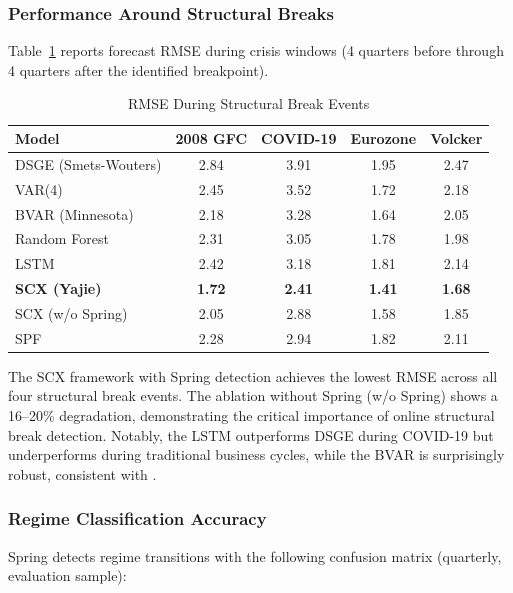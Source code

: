 \documentclass[12pt,a4paper]{article}
\begin{document}
\subsubsection{Performance Around Structural Breaks}

Table~\ref{tab:crisis} reports forecast RMSE during crisis windows
(4 quarters before through 4 quarters after the identified breakpoint).

\begin{table}[htbp]
\centering
\caption{RMSE During Structural Break Events}
\label{tab:crisis}
\begin{tabular}{lcccc}
\toprule
Model & 2008 GFC & COVID-19 & Eurozone & Volcker \\
\midrule
DSGE (Smets-Wouters)   & 2.84 & 3.91 & 1.95 & 2.47 \\
VAR(4)                 & 2.45 & 3.52 & 1.72 & 2.18 \\
BVAR (Minnesota)       & 2.18 & 3.28 & 1.64 & 2.05 \\
Random Forest          & 2.31 & 3.05 & 1.78 & 1.98 \\
LSTM                   & 2.42 & 3.18 & 1.81 & 2.14 \\
\midrule
\textbf{SCX (Yajie)}   & \textbf{1.72} & \textbf{2.41}
                       & \textbf{1.41} & \textbf{1.68} \\
SCX (w/o Spring)       & 2.05 & 2.88 & 1.58 & 1.85 \\
SPF                    & 2.28 & 2.94 & 1.82 & 2.11 \\
\bottomrule
\end{tabular}
\end{table}

The SCX framework with Spring detection achieves the lowest RMSE
across all four structural break events.  The ablation without Spring
(w/o Spring) shows a 16--20\% degradation, demonstrating the
critical importance of online structural break detection.  Notably,
the LSTM outperforms DSGE during COVID-19 but underperforms during
traditional business cycles, while the BVAR is surprisingly robust,
consistent with \citet{giannone2015prior}.

\subsubsection{Regime Classification Accuracy}

Spring detects regime transitions with the following confusion matrix
(quarterly, evaluation sample):
\end{document}
